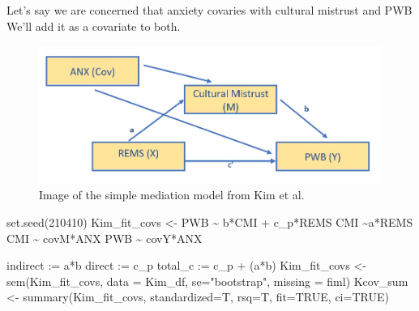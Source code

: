 \documentclass[
  english,
]{book}
\newenvironment{Shaded}{\begin{snugshade}}{\end{snugshade}}
\newcommand{\AttributeTok}[1]{\textcolor[rgb]{0.77,0.63,0.00}{#1}}
\newcommand{\ConstantTok}[1]{\textcolor[rgb]{0.00,0.00,0.00}{#1}}
\newcommand{\DecValTok}[1]{\textcolor[rgb]{0.00,0.00,0.81}{#1}}
\newcommand{\FunctionTok}[1]{\textcolor[rgb]{0.00,0.00,0.00}{#1}}
\newcommand{\NormalTok}[1]{#1}
\newcommand{\OtherTok}[1]{\textcolor[rgb]{0.56,0.35,0.01}{#1}}
\newcommand{\StringTok}[1]{\textcolor[rgb]{0.31,0.60,0.02}{#1}}
\begin{document}
Let's say we are concerned that anxiety covaries with cultural mistrust and PWB We'll add it as a covariate to both.

\begin{figure}
\centering
\includegraphics{images/SimpleMed/Kim_wCovs.jpg}
\caption{Image of the simple mediation model from Kim et al.}
\end{figure}

\begin{Shaded}
\begin{Highlighting}[]
\FunctionTok{set.seed}\NormalTok{(}\DecValTok{210410}\NormalTok{)}
\NormalTok{Kim\_fit\_covs }\OtherTok{\textless{}{-}} \StringTok{\textquotesingle{}}
\StringTok{          PWB \textasciitilde{} b*CMI + c\_p*REMS }
\StringTok{          CMI \textasciitilde{}a*REMS}
\StringTok{          CMI \textasciitilde{} covM*ANX}
\StringTok{          PWB \textasciitilde{} covY*ANX}

\StringTok{          indirect :=  a*b}
\StringTok{          direct  := c\_p}
\StringTok{          total\_c  := c\_p + (a*b)}
\StringTok{          \textquotesingle{}}
\NormalTok{Kim\_fit\_covs }\OtherTok{\textless{}{-}} \FunctionTok{sem}\NormalTok{(Kim\_fit\_covs, }\AttributeTok{data =}\NormalTok{ Kim\_df, }\AttributeTok{se=}\StringTok{"bootstrap"}\NormalTok{, }\AttributeTok{missing =} \StringTok{\textquotesingle{}fiml\textquotesingle{}}\NormalTok{)}
\NormalTok{Kcov\_sum }\OtherTok{\textless{}{-}} \FunctionTok{summary}\NormalTok{(Kim\_fit\_covs, }\AttributeTok{standardized=}\NormalTok{T, }\AttributeTok{rsq=}\NormalTok{T, }\AttributeTok{fit=}\ConstantTok{TRUE}\NormalTok{, }\AttributeTok{ci=}\ConstantTok{TRUE}\NormalTok{)}
\end{Highlighting}
\end{Shaded}
\end{document}
